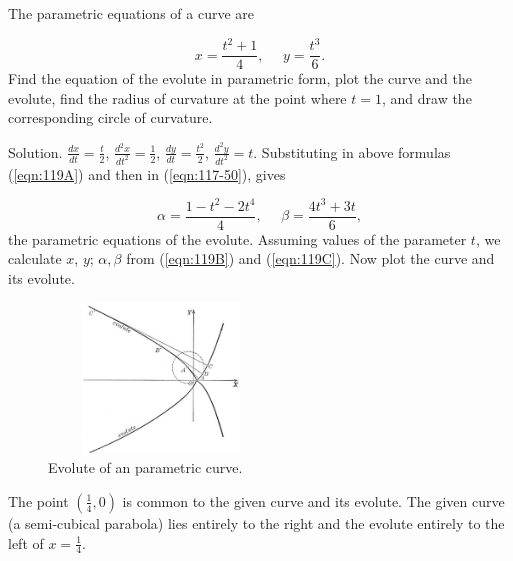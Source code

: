 \begin{example}
{\rm
The parametric equations of a curve are

\begin{equation}
\label{eqn:119B}
x = \frac{t^2 + 1}{4}, \ \ \ \ \ \ 
y = \frac{t^3}{6}.
\end{equation}
Find the equation of the evolute in parametric form, 
plot the curve and the evolute, find the radius of curvature 
at the point where $t = 1$, and draw the corresponding circle of curvature.

Solution. 	
$\frac{dx}{dt} = \frac{t}{2}$, $\frac{d^2 x}{dt^2} = \frac{1}{2}$,
$\frac{dy}{dt} = \frac{t^2}{2}$, $\frac{d^2 y}{dt^2} = t$.
Substituting in above formulas (\ref{eqn:119A}) %
and then in (\ref{eqn:117-50}), %
gives

\begin{equation}
\label{eqn:119C}
\alpha = \frac{1 - t^2 - 2t^4}{4}, \ \ \ \ \ \ 
\beta = \frac{4t^3 + 3t}{6},
\end{equation}
the parametric equations of the evolute. Assuming values of 
the parameter $t$, we calculate $x$, $y$; $\alpha, \beta$
from (\ref{eqn:119B}) and (\ref{eqn:119C}).
Now plot the curve and its evolute.

\begin{figure}[h!]
\begin{minipage}{\textwidth}
\begin{center}
\includegraphics[height=4cm,width=6cm]{evolute-parametric-example.eps}
\end{center}
\end{minipage}
\caption{Evolute of an parametric curve.}
\label{fig:evolute-parametric-example}
\end{figure}

\noindent
The point $(\frac{1}{4}, 0)$ is common to the given curve 
and its evolute. The given curve (a semi-cubical parabola) lies 
entirely to the right and the evolute entirely to the left of 
$x = \frac{1}{4}$.

}
\end{example}

